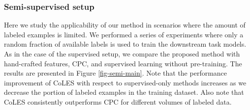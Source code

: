 \documentclass[sigconf, anonymous]{acmart}
\begin{document}
\subsubsection{Semi-supervised setup}

Here we study the applicability of our method in scenarios where the amount of labeled examples is
limited. We performed a series of experiments where only a random fraction of available labels is
used to train the downstream task models. As in the case of the supervised setup, we compare the proposed
method with hand-crafted features, CPC, and supervised learning without pre-training.
% 
The results are presented in Figure \ref{fig-semi-main}. Note that the performance improvement of
CoLES with respect to supervised-only methods increases as we decrease the portion of labeled examples
in the training dataset. Also note that CoLES consistently outperforms CPC for different volumes
of labeled data.
\end{document}
